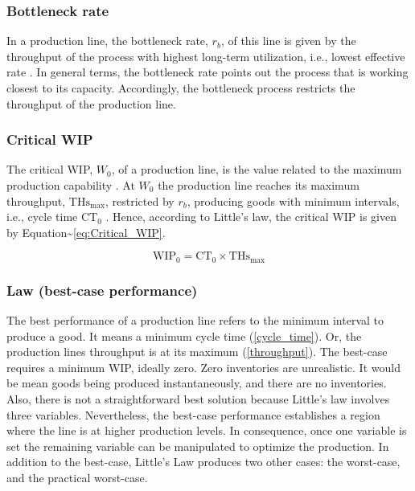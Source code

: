 \documentclass{article}
\begin{document}
\subsubsection{Bottleneck rate}
\label{sec:org93d1480}

In a production line, the bottleneck rate, \(r_b\), of this line is given by the throughput of the process with highest long-term utilization, i.e., lowest effective rate \citep{Hopp2001}.
In general terms, the bottleneck rate points out the process that is working closest to its capacity.
Accordingly, the bottleneck process restricts the throughput of the production line.

\subsubsection{Critical WIP}
\label{sec:org5d29bf6}

The critical WIP, \(W_0\), of a production line, is the value related to the maximum production capability \citep{Hopp2001}.
At \(W_0\) the production line reaches its maximum throughput, \(\mbox{THs}_{\mbox{max}}\), restricted by \(r_b\), producing goods with minimum intervals, i.e., cycle time \(\mbox{CT}_0\) \citep{Martin1998}.
Hence, according to Little's law, the critical WIP is given by Equation\textasciitilde{}\ref{eq:Critical_WIP}.

\label{eq:Critical_WIP}
\begin{equation} 
  \mbox{WIP}_0 = \mbox{CT}_0 \times \mbox{THs}_{\mbox{max}}
\end{equation}

\subsubsection{Law (best-case performance)}
\label{sec:orgdee1c95}

The best performance of a production line refers to the minimum interval to produce a good.
It means a minimum cycle time (\ref{cycle_time}).
Or, the production lines throughput is at its maximum (\ref{throughput}).
The best-case requires a minimum WIP, ideally zero.
Zero inventories are unrealistic.
It would be mean goods being produced instantaneously, and there are no inventories.
Also, there is not a straightforward best solution because Little's law involves three variables.
Nevertheless, the best-case performance establishes a region where the line is at higher production levels.
In consequence, once one variable is set the remaining variable can be manipulated to optimize the production.
In addition to the best-case, Little's Law produces two other cases: the worst-case, and the practical worst-case.
\end{document}
